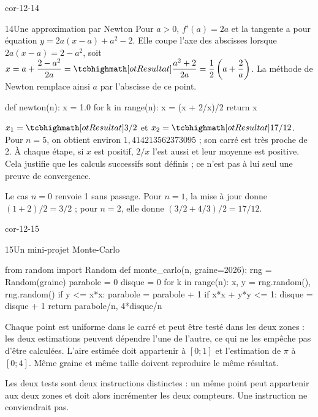 \begin{blocLivre}{cor-12-14}
\begin{corrige}{14}{Une approximation par Newton}
Pour $a>0$, $f'(a)=2a$ et la tangente a pour équation $y=2a(x-a)+a^2-2$.
Elle coupe l'axe des abscisses lorsque $2a(x-a)=2-a^2$, soit
$x=a+\dfrac{2-a^2}{2a}=\res{\dfrac{a^2+2}{2a}=\dfrac12\left(a+\dfrac2a\right)}$.
La méthode de Newton remplace ainsi $a$ par l'abscisse de ce point.
\begin{python}
def newton(n):
    x = 1.0
    for k in range(n):
        x = (x + 2/x)/2
    return x
\end{python}
$x_1=\res{3/2}$ et $x_2=\res{17/12}$. Pour $n=5$, on obtient environ
$1{,}414213562373095$ ; son carré est très proche de 2.
À chaque étape, si $x$ est positif, $2/x$ l'est aussi et leur moyenne est positive.
Cela justifie que les calculs successifs sont définis ; ce n'est pas à lui seul une preuve de convergence.

Le cas $n=0$ renvoie 1 sans passage. Pour $n=1$, la mise à jour donne $(1+2)/2=3/2$ ; pour $n=2$, elle donne $(3/2+4/3)/2=17/12$.

\end{corrige}
\end{blocLivre}
\begin{blocLivre}{cor-12-15}
\begin{corrige}{15}{Un mini-projet Monte-Carlo}
\begin{python}
from random import Random
def monte_carlo(n, graine=2026):
    rng = Random(graine)
    parabole = 0
    disque = 0
    for k in range(n):
        x, y = rng.random(), rng.random()
        if y <= x*x:
            parabole = parabole + 1
        if x*x + y*y <= 1:
            disque = disque + 1
    return parabole/n, 4*disque/n
\end{python}
Chaque point est uniforme dans le carré et peut être testé dans les deux zones : les deux estimations
peuvent dépendre l'une de l'autre, ce qui ne les empêche pas d'être calculées.
L'aire estimée doit appartenir à $[0;1]$ et l'estimation de $\pi$ à $[0;4]$.
Même graine et même taille doivent reproduire le même résultat.

Les deux tests sont deux instructions  distinctes : un même point peut appartenir aux deux zones et doit alors incrémenter les deux compteurs. Une instruction  ne conviendrait pas.

\label{figlivre-r12-15-zones-cor}

\end{corrige}
\end{blocLivre}

